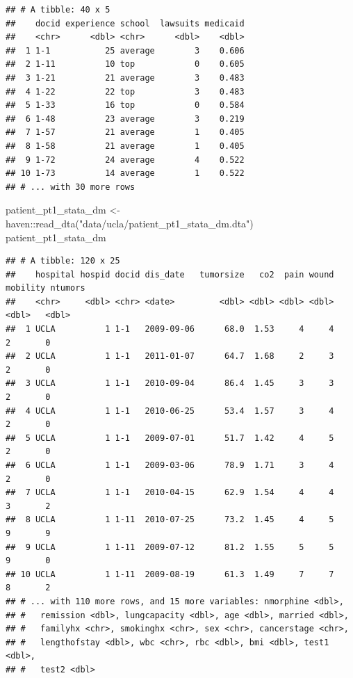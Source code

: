 \documentclass[
]{book}
\newenvironment{Shaded}{\begin{snugshade}}{\end{snugshade}}
\newcommand{\FunctionTok}[1]{\textcolor[rgb]{0.00,0.00,0.00}{#1}}
\newcommand{\NormalTok}[1]{#1}
\newcommand{\OtherTok}[1]{\textcolor[rgb]{0.56,0.35,0.01}{#1}}
\newcommand{\SpecialCharTok}[1]{\textcolor[rgb]{0.00,0.00,0.00}{#1}}
\newcommand{\StringTok}[1]{\textcolor[rgb]{0.31,0.60,0.02}{#1}}
\begin{document}
\begin{verbatim}
## # A tibble: 40 x 5
##    docid experience school  lawsuits medicaid
##    <chr>      <dbl> <chr>      <dbl>    <dbl>
##  1 1-1           25 average        3    0.606
##  2 1-11          10 top            0    0.605
##  3 1-21          21 average        3    0.483
##  4 1-22          22 top            3    0.483
##  5 1-33          16 top            0    0.584
##  6 1-48          23 average        3    0.219
##  7 1-57          21 average        1    0.405
##  8 1-58          21 average        1    0.405
##  9 1-72          24 average        4    0.522
## 10 1-73          14 average        1    0.522
## # ... with 30 more rows
\end{verbatim}

\begin{Shaded}
\begin{Highlighting}[]
\NormalTok{patient\_pt1\_stata\_dm }\OtherTok{\textless{}{-}}\NormalTok{ haven}\SpecialCharTok{::}\FunctionTok{read\_dta}\NormalTok{(}\StringTok{"data/ucla/patient\_pt1\_stata\_dm.dta"}\NormalTok{)}
\NormalTok{patient\_pt1\_stata\_dm}
\end{Highlighting}
\end{Shaded}

\begin{verbatim}
## # A tibble: 120 x 25
##    hospital hospid docid dis_date   tumorsize   co2  pain wound mobility ntumors
##    <chr>     <dbl> <chr> <date>         <dbl> <dbl> <dbl> <dbl>    <dbl>   <dbl>
##  1 UCLA          1 1-1   2009-09-06      68.0  1.53     4     4        2       0
##  2 UCLA          1 1-1   2011-01-07      64.7  1.68     2     3        2       0
##  3 UCLA          1 1-1   2010-09-04      86.4  1.45     3     3        2       0
##  4 UCLA          1 1-1   2010-06-25      53.4  1.57     3     4        2       0
##  5 UCLA          1 1-1   2009-07-01      51.7  1.42     4     5        2       0
##  6 UCLA          1 1-1   2009-03-06      78.9  1.71     3     4        2       0
##  7 UCLA          1 1-1   2010-04-15      62.9  1.54     4     4        3       2
##  8 UCLA          1 1-11  2010-07-25      73.2  1.45     4     5        9       9
##  9 UCLA          1 1-11  2009-07-12      81.2  1.55     5     5        9       0
## 10 UCLA          1 1-11  2009-08-19      61.3  1.49     7     7        8       2
## # ... with 110 more rows, and 15 more variables: nmorphine <dbl>,
## #   remission <dbl>, lungcapacity <dbl>, age <dbl>, married <dbl>,
## #   familyhx <chr>, smokinghx <chr>, sex <chr>, cancerstage <chr>,
## #   lengthofstay <dbl>, wbc <chr>, rbc <dbl>, bmi <dbl>, test1 <dbl>,
## #   test2 <dbl>
\end{verbatim}
\end{document}
